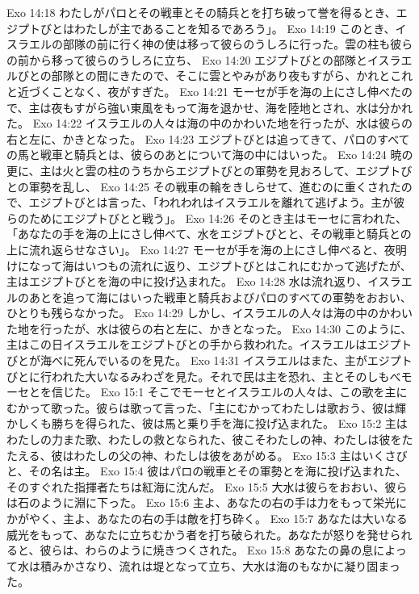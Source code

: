Exo 14:18  わたしがパロとその戦車とその騎兵とを打ち破って誉を得るとき、エジプトびとはわたしが主であることを知るであろう」。
Exo 14:19  このとき、イスラエルの部隊の前に行く神の使は移って彼らのうしろに行った。雲の柱も彼らの前から移って彼らのうしろに立ち、
Exo 14:20  エジプトびとの部隊とイスラエルびとの部隊との間にきたので、そこに雲とやみがあり夜もすがら、かれとこれと近づくことなく、夜がすぎた。
Exo 14:21  モーセが手を海の上にさし伸べたので、主は夜もすがら強い東風をもって海を退かせ、海を陸地とされ、水は分かれた。
Exo 14:22  イスラエルの人々は海の中のかわいた地を行ったが、水は彼らの右と左に、かきとなった。
Exo 14:23  エジプトびとは追ってきて、パロのすべての馬と戦車と騎兵とは、彼らのあとについて海の中にはいった。
Exo 14:24  暁の更に、主は火と雲の柱のうちからエジプトびとの軍勢を見おろして、エジプトびとの軍勢を乱し、
Exo 14:25  その戦車の輪をきしらせて、進むのに重くされたので、エジプトびとは言った、「われわれはイスラエルを離れて逃げよう。主が彼らのためにエジプトびとと戦う」。
Exo 14:26  そのとき主はモーセに言われた、「あなたの手を海の上にさし伸べて、水をエジプトびとと、その戦車と騎兵との上に流れ返らせなさい」。
Exo 14:27  モーセが手を海の上にさし伸べると、夜明けになって海はいつもの流れに返り、エジプトびとはこれにむかって逃げたが、主はエジプトびとを海の中に投げ込まれた。
Exo 14:28  水は流れ返り、イスラエルのあとを追って海にはいった戦車と騎兵およびパロのすべての軍勢をおおい、ひとりも残らなかった。
Exo 14:29  しかし、イスラエルの人々は海の中のかわいた地を行ったが、水は彼らの右と左に、かきとなった。
Exo 14:30  このように、主はこの日イスラエルをエジプトびとの手から救われた。イスラエルはエジプトびとが海べに死んでいるのを見た。
Exo 14:31  イスラエルはまた、主がエジプトびとに行われた大いなるみわざを見た。それで民は主を恐れ、主とそのしもべモーセとを信じた。
Exo 15:1  そこでモーセとイスラエルの人々は、この歌を主にむかって歌った。彼らは歌って言った、「主にむかってわたしは歌おう、彼は輝かしくも勝ちを得られた、彼は馬と乗り手を海に投げ込まれた。
Exo 15:2  主はわたしの力また歌、わたしの救となられた、彼こそわたしの神、わたしは彼をたたえる、彼はわたしの父の神、わたしは彼をあがめる。
Exo 15:3  主はいくさびと、その名は主。
Exo 15:4  彼はパロの戦車とその軍勢とを海に投げ込まれた、そのすぐれた指揮者たちは紅海に沈んだ。
Exo 15:5  大水は彼らをおおい、彼らは石のように淵に下った。
Exo 15:6  主よ、あなたの右の手は力をもって栄光にかがやく、主よ、あなたの右の手は敵を打ち砕く。
Exo 15:7  あなたは大いなる威光をもって、あなたに立ちむかう者を打ち破られた。あなたが怒りを発せられると、彼らは、わらのように焼きつくされた。
Exo 15:8  あなたの鼻の息によって水は積みかさなり、流れは堤となって立ち、大水は海のもなかに凝り固まった。

